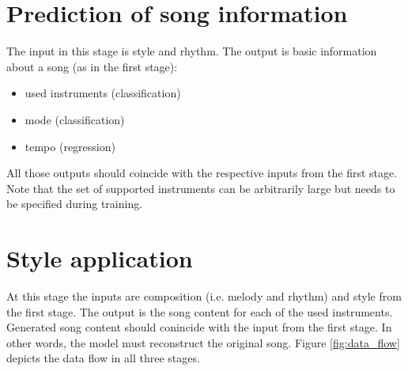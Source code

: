 \documentclass[en]{pracamgr}
\begin{document}
\section{Prediction of song information}

The input in this stage is style and rhythm.
The output is basic information about a song (as in the first stage):
\begin{itemize}
    \item used instruments (classification)
    \item mode (classification)
    \item tempo (regression)
\end{itemize}

All those outputs should coincide with the respective inputs from the first stage.
Note that the set of supported instruments can be arbitrarily large but needs to be specified during training.

\section{Style application}

At this stage the inputs are composition (i.e. melody and rhythm) and style from the first stage.
The output is the song content for each of the used instruments.
Generated song content should conincide with the input from the first stage.
In other words, the model must reconstruct the original song.
Figure \ref{fig:data_flow} depicts the data flow in all three stages.
\end{document}
